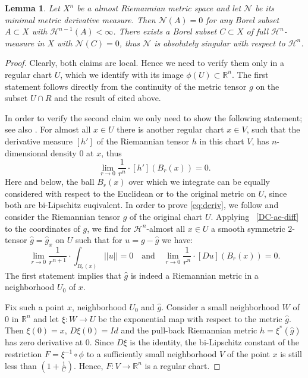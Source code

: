 \documentclass[12pt,leqno,intlimits]{amsart}
\numberwithin{equation}{section}
\newtheorem{lem}[thm]{Lemma}
\theoremstyle{definition}
\theoremstyle{remark}
\newcommand{\R}{\mathbb{R}}
\def\:{\colon}
\begin{document}
\begin{lem} \label{lem:minderiv}
Let $X^n$ be a almost Riemannian metric space and let $\mathcal N$ be its minimal metric derivative measure.
Then $\mathcal N (A)=0$ for any Borel subset $A\subset X$ with $\mathcal H^{n-1} (A)<\infty$.
There exists a Borel subset $C\subset X$ of full $\mathcal H^n$-measure in $X$ with
$\mathcal N(C)=0$, thus $\mathcal N$ is absolutely singular with respect to $\mathcal H^n$.
\end{lem}

\begin{proof}
Clearly, both claims are local. Hence we need to verify them only in a regular chart $U$, which we identify with its image $\phi (U) \subset \R^n$. The first statement
follows directly from the continuity of the metric tensor $g$ on the subset $U\cap R$ and the result of \cite{Goffmann}
cited above.

In order to verify the second claim we only need to show the following statement;
see also \cite[Section 1.6]{Evans}.
For almost all $x\in U$ there is another
regular chart $x\in V$, such that the derivative measure $[h']$ of the Riemannian tensor $h$ in this chart $V$, has $n$-dimensional density $0$
at $x$, thus
\begin{equation} \label{eq:deriv}
\lim _{r\to 0} \frac 1 {r^n} \cdot {[h'] (B_r (x))} =0 .
\end{equation}
Here and below, the ball $B_r (x)$ over which we integrate can be equally considered with respect to the Euclidean or to the original metric on $U$, since both are bi-Lipschitz euqivalent.
In order to prove \eqref{eq:deriv}, we follow \cite[Section 4.2]{Per-DC} and consider the Riemannian tensor $g$ of the original chart $U$. Applying ~\eqref{DC-ae-diff} to the coordinates of $g$, we find for $\mathcal H^n$-almost all
$x\in U$ a smooth symmetric $2$-tensor $\hat g =\hat g_x$ on $U$ such that for
$u=g-\hat g$ we have:
\begin{equation} \label{eq:u}
\lim_{r\to 0}\frac 1 {r^{n+1}}\cdot \int _{B_r(x)} ||u|| =0
\quad\text{and}\quad
\lim _{r\to 0} \frac 1 {r^n} \cdot [Du] (B_r (x)) =0  .
\end{equation}
The first statement implies that $\hat g$ is indeed a Riemannian metric in a neighborhood $U_0$ of $x$.

Fix such a point $x$, neighborhood $U_0$ and $\hat g$.
Consider a small neighborhood $W$ of $0$ in $\R^n$ and let $\xi \:W\to U$ be the exponential map with respect to the metric
$\hat g$. Then $\xi (0)=x$, $D\xi (0) =Id$ and the pull-back Riemannian metric $\hat h= \xi^{\ast} (\hat g)$ has zero derivative at $0$. Since $D\xi$ is the identity, the bi-Lipschitz constant of the restriction $F=\xi ^{-1} \circ \phi$ to a sufficiently
small neighborhood $V$ of the point $x$ is still less than $(1 + \frac 1 C)$.
Hence, $F\:V\to \R^n$ is a regular chart.


\end{proof}
\end{document}
